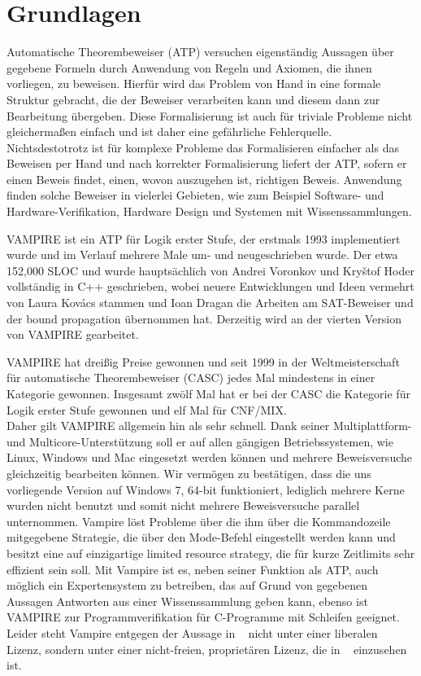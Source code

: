 \documentclass{article}
\begin{document}
\section{Grundlagen}
\label{sec:foundations}
Automatische Theorembeweiser (ATP) versuchen eigenständig Aussagen über gegebene Formeln durch Anwendung von Regeln und Axiomen, die ihnen vorliegen, zu beweisen.
Hierfür wird das Problem von Hand in eine formale Struktur gebracht, die der Beweiser verarbeiten kann und diesem dann zur Bearbeitung übergeben.
Diese Formalisierung ist auch für triviale Probleme nicht gleichermaßen einfach und ist daher eine gefährliche Fehlerquelle. 
Nichtsdestotrotz ist für komplexe Probleme das Formalisieren einfacher als das Beweisen per Hand und nach korrekter Formalisierung liefert der ATP, 
sofern er einen Beweis findet, einen, wovon auszugehen ist, richtigen Beweis. 
Anwendung finden solche Beweiser in vielerlei Gebieten, wie zum Beispiel Software- und Hardware-Verifikation, Hardware Design und Systemen mit Wissenssammlungen.

VAMPIRE ist ein ATP für Logik erster Stufe, der erstmals 1993 implementiert wurde und im Verlauf mehrere Male um- und neugeschrieben wurde.
Der etwa 152,000 SLOC und wurde hauptsächlich von Andrei Voronkov und Kry{\v{s}}tof Hoder vollständig in C++ geschrieben, 
wobei neuere Entwicklungen und Ideen vermehrt von Laura Kov{\'a}cs stammen und Ioan Dragan die Arbeiten am SAT-Beweiser und der bound propagation übernommen hat.
Derzeitig wird an der vierten Version von VAMPIRE gearbeitet.

VAMPIRE hat dreißig Preise gewonnen und seit 1999 in der Weltmeisterschaft für automatische Theorembeweiser (CASC) jedes Mal mindestens in einer Kategorie gewonnen.
Insgesamt zwölf Mal hat er bei der CASC die Kategorie für Logik erster Stufe gewonnen und elf Mal für CNF/MIX. ~\cite{vampirehp} \\ Daher gilt VAMPIRE allgemein hin als sehr schnell.
Dank seiner Multiplattform- und Multicore-Unterstützung soll er auf allen gängigen Betriebssystemen, wie Linux, Windows und Mac eingesetzt werden können und mehrere Beweisversuche gleichzeitig bearbeiten können.
Wir vermögen zu bestätigen, dass die uns vorliegende Version auf Windows 7, 64-bit funktioniert, lediglich mehrere Kerne wurden nicht benutzt und somit nicht mehrere Beweisversuche parallel unternommen.
Vampire löst Probleme über die ihm über die Kommandozeile mitgegebene Strategie, die über den Mode-Befehl eingestellt werden kann und besitzt eine auf einzigartige limited resource strategy, die für kurze Zeitlimits sehr effizient sein soll. Mit Vampire ist es, neben seiner Funktion als ATP, auch möglich ein Expertensystem zu betreiben, das auf Grund von gegebenen Aussagen Antworten aus einer Wissenssammlung geben kann, ebenso ist VAMPIRE zur Programmverifikation für C-Programme mit Schleifen geeignet. 
Leider steht Vampire entgegen der Aussage in ~\cite{cav2013} nicht unter einer liberalen Lizenz, sondern unter einer nicht-freien, proprietären Lizenz, die in ~\cite{vampirehp} einzusehen ist.
\end{document}

